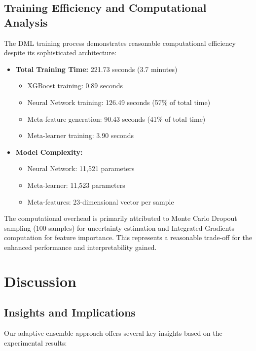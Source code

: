 \documentclass[10pt,journal,compsoc]{IEEEtran}
\begin{document}
\subsection{Training Efficiency and Computational Analysis}

The DML training process demonstrates reasonable computational efficiency despite its sophisticated architecture:

\begin{itemize}
    \item \textbf{Total Training Time:} 221.73 seconds (3.7 minutes)
    \begin{itemize}
        \item XGBoost training: 0.89 seconds
        \item Neural Network training: 126.49 seconds (57\% of total time)
        \item Meta-feature generation: 90.43 seconds (41\% of total time)
        \item Meta-learner training: 3.90 seconds
    \end{itemize}
    
    \item \textbf{Model Complexity:}
    \begin{itemize}
        \item Neural Network: 11,521 parameters
        \item Meta-learner: 11,523 parameters
        \item Meta-features: 23-dimensional vector per sample
    \end{itemize}
\end{itemize}

The computational overhead is primarily attributed to Monte Carlo Dropout sampling (100 samples) for uncertainty estimation and Integrated Gradients computation for feature importance. This represents a reasonable trade-off for the enhanced performance and interpretability gained.

\section{Discussion}

\subsection{Insights and Implications}

Our adaptive ensemble approach offers several key insights based on the experimental results:
\end{document}
